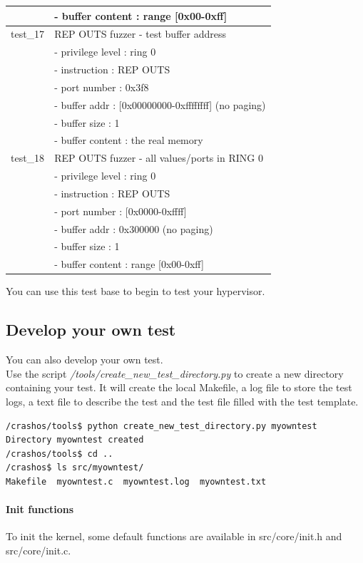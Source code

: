 \documentclass[12pt, openany]{report}
\begin{document}
\begin{longtable}{|l | l |}
&- buffer content  : range [0x00-0xff]\\
\hline
test\_17 & REP OUTS fuzzer - test buffer address\\
&- privilege level : ring 0\\
&- instruction     : REP OUTS\\
&- port number     : 0x3f8\\
&- buffer addr     : [0x00000000-0xffffffff] (no paging)\\
&- buffer size     : 1\\
&- buffer content  : the real memory \\
\hline
test\_18 & REP OUTS fuzzer - all values/ports in RING 0 \\
&- privilege level : ring 0\\
&- instruction     : REP OUTS\\
&- port number     : [0x0000-0xffff]\\
&- buffer addr     : 0x300000 (no paging)\\
&- buffer size     : 1\\
&- buffer content  : range [0x00-0xff]\\
\hline

\end{longtable}

You can use this test base to begin to test your hypervisor.



\subsection*{Develop your own test}
You can also develop your own test. 
\\Use the script \emph{/tools/create\_new\_test\_directory.py} to create a new directory containing your test. It will create the local Makefile, a log file to store the test logs, a text file to describe the test and the test file filled with the test template.
\begin{lstlisting}
/crashos/tools$ python create_new_test_directory.py myowntest
Directory myowntest created
/crashos/tools$ cd ..
/crashos$ ls src/myowntest/
Makefile  myowntest.c  myowntest.log  myowntest.txt
\end{lstlisting}

\paragraph{Init functions}To init the kernel, some default functions are available in src/core/init.h and src/core/init.c.
\end{document}
